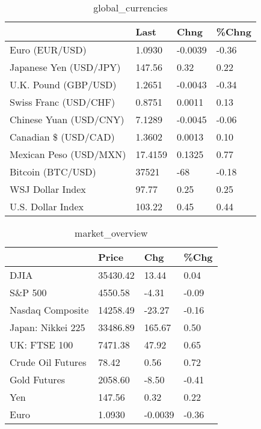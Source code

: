 \documentclass{article}%
\begin{document}
%


\begin{table}[htbp]%
\caption{global\_currencies}%
\centering%
\begin{adjustbox}{width=1\textwidth}%
\begin{tabular}{llll}
\toprule
                       &    Last &    Chng & \%Chng \\
\midrule
        Euro (EUR/USD) &  1.0930 & -0.0039 & -0.36 \\
Japanese Yen (USD/JPY) &  147.56 &    0.32 &  0.22 \\
  U.K. Pound (GBP/USD) &  1.2651 & -0.0043 & -0.34 \\
 Swiss Franc (USD/CHF) &  0.8751 &  0.0011 &  0.13 \\
Chinese Yuan (USD/CNY) &  7.1289 & -0.0045 & -0.06 \\
  Canadian \$ (USD/CAD) &  1.3602 &  0.0013 &  0.10 \\
Mexican Peso (USD/MXN) & 17.4159 &  0.1325 &  0.77 \\
     Bitcoin (BTC/USD) &   37521 &     -68 & -0.18 \\
      WSJ Dollar Index &   97.77 &    0.25 &  0.25 \\
     U.S. Dollar Index &  103.22 &    0.45 &  0.44 \\
\bottomrule
\end{tabular}
%
\end{adjustbox}%
\end{table}

%


\begin{table}[htbp]%
\caption{market\_overview}%
\centering%
\begin{adjustbox}{width=1\textwidth}%
\begin{tabular}{llll}
\toprule
                  &    Price &     Chg &  \%Chg \\
\midrule
             DJIA & 35430.42 &   13.44 &  0.04 \\
          S\&P 500 &  4550.58 &   -4.31 & -0.09 \\
 Nasdaq Composite & 14258.49 &  -23.27 & -0.16 \\
Japan: Nikkei 225 & 33486.89 &  165.67 &  0.50 \\
     UK: FTSE 100 &  7471.38 &   47.92 &  0.65 \\
Crude Oil Futures &    78.42 &    0.56 &  0.72 \\
     Gold Futures &  2058.60 &   -8.50 & -0.41 \\
              Yen &   147.56 &    0.32 &  0.22 \\
             Euro &   1.0930 & -0.0039 & -0.36 \\
\bottomrule
\end{tabular}
%
\end{adjustbox}%
\end{table}

%
\end{document}
